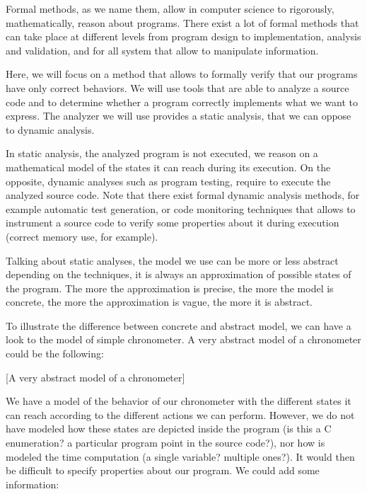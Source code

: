 \documentclass[middle]{zmdocument}
\begin{document}


Formal methods, as we name them, allow in computer science to
rigorously, mathematically, reason about programs. There exist a lot of
formal methods that can take place at different levels from program
design to implementation, analysis and validation, and for all system
that allow to manipulate information.



Here, we will focus on a method that allows to formally verify that our
programs have only correct behaviors. We will use tools that are able to
analyze a source code and to determine whether a program correctly
implements what we want to express. The analyzer we will use provides a
static analysis, that we can oppose to dynamic analysis.



In static analysis, the analyzed program is not executed, we reason on a
mathematical model of the states it can reach during its execution. On
the opposite, dynamic analyses such as program testing, require to
execute the analyzed source code. Note that there exist formal dynamic
analysis methods, for example automatic test generation, or code
monitoring techniques that allows to instrument a source code to verify
some properties about it during execution (correct memory use, for
example).



Talking about static analyses, the model we use can be more or less
abstract depending on the techniques, it is always an approximation of
possible states of the program. The more the approximation is precise,
the more the model is concrete, the more the approximation is vague, the
more it is abstract.



To illustrate the difference between concrete and abstract model, we can
have a look to the model of simple chronometer. A very abstract model of
a chronometer could be the following:



[A very abstract model of a chronometer]


We have a model of the behavior of our chronometer with the different
states it can reach according to the different actions we can perform.
However, we do not have modeled how these states are depicted inside the
program (is this a C enumeration? a particular program point in the
source code?), nor how is modeled the time computation (a single
variable? multiple ones?). It would then be difficult to specify
properties about our program. We could add some information:
\end{document}
